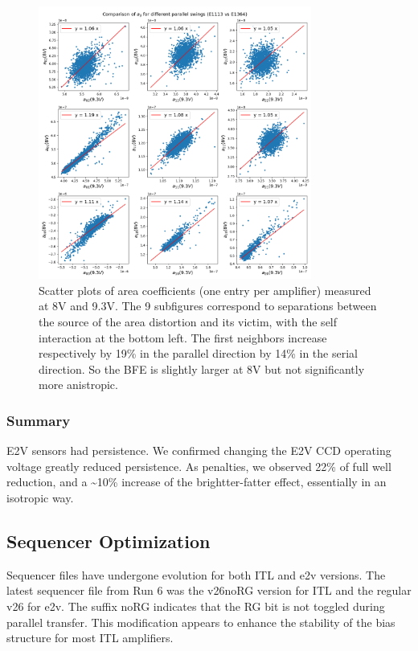 \begin{figure}
\begin{centering}
\includegraphics[width=0.8\textwidth]{sections/figures/aScatterPlots8vs9-3.png}
\end{centering}
\caption{Scatter plots of area coefficients (one entry per amplifier)
measured at 8V and 9.3V. The 9 subfigures correspond to separations
between the source of the area distortion and its victim, with the self
interaction at the bottom left. The first neighbors increase
respectively by 19\% in the parallel direction by 14\% in the serial
direction. So the BFE is slightly larger at 8V but not significantly
more anistropic.}
\end{figure}

\subsubsection{Summary}\label{summary}

E2V sensors had persistence. We confirmed changing the E2V CCD operating
voltage greatly reduced persistence. As penalties, we observed 22\% of
full well reduction, and a \textasciitilde10\% increase of the
brightter-fatter effect, essentially in an isotropic way.

\subsection{Sequencer Optimization}\label{sequencer-optimization}

Sequencer files have undergone evolution for both ITL and e2v versions.
The latest sequencer file from Run 6 was the
v26\label{norg}{noRG} version for ITL and the regular v26
for e2v. The suffix \label{norg}{noRG} indicates that the
RG bit is not toggled during parallel transfer. This modification
appears to enhance the stability of the bias structure for most ITL
amplifiers.

